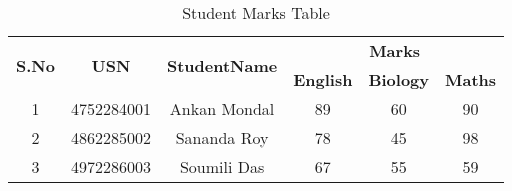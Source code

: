\documentclass{article}
\begin{document}
\begin{table}[h!]
    \centering
    \caption{Student Marks Table}
    \begin{tabular}{|c|c|c|c|c|c|}
        \hline
        \multirow{2}{*}{\textbf{S.No}} & \multirow{2}{*}{\textbf{USN}} & \multirow{2}{*}{\textbf{StudentName}} & \multicolumn{3}{c|}{\textbf{Marks}} \\ \cline{4-6}
        & & & \textbf{English} & \textbf{Biology} & \textbf{Maths} \\ \hline
        1 & 4752284001 & Ankan Mondal & 89 & 60 & 90 \\ \hline
        2 & 4862285002 & Sananda Roy & 78 & 45 & 98 \\ \hline
        3 & 4972286003 & Soumili Das & 67 & 55 & 59 \\ \hline
    \end{tabular}
    \label{tab:marks}
\end{table}
\end{document}
